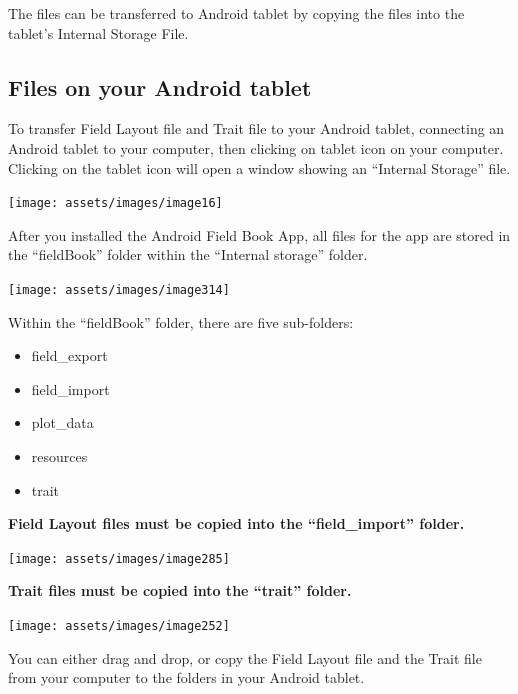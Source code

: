 \documentclass[
  12pt,
]{book}
\begin{document}
The files can be transferred to Android tablet by copying the files into the tablet's Internal Storage File.

\hypertarget{files-on-your-android-tablet}{%
\subsection{Files on your Android tablet}\label{files-on-your-android-tablet}}

To transfer Field Layout file and Trait file to your Android tablet, connecting an Android tablet to your computer, then clicking on tablet icon on your computer. Clicking on the tablet icon will open a window showing an ``Internal Storage'' file.

\begin{center}\texttt{[image: assets/images/image16]} \end{center}

After you installed the Android Field Book App, all files for the app are stored in the ``fieldBook'' folder within the ``Internal storage'' folder.

\begin{center}\texttt{[image: assets/images/image314]} \end{center}

Within the ``fieldBook'' folder, there are five sub-folders:

\begin{itemize}
\item
  field\_export
\item
  field\_import
\item
  plot\_data
\item
  resources
\item
  trait
\end{itemize}

\textbf{Field Layout files must be copied into the ``field\_import'' folder.}

\begin{center}\texttt{[image: assets/images/image285]} \end{center}

\textbf{Trait files must be copied into the ``trait'' folder.}

\begin{center}\texttt{[image: assets/images/image252]} \end{center}

You can either drag and drop, or copy the Field Layout file and the Trait file from your computer to the folders in your Android tablet.
\end{document}
